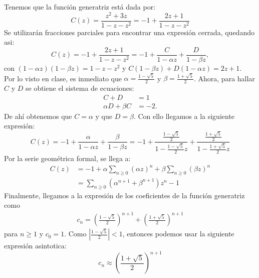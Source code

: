 \begin{solution}
    Tenemos que la función generatriz está dada por:
    \begin{equation*}
        C(z)=\frac{z^2+3z}{1-z-z^2}=-1+\frac{2z+1}{1-z-z^2}
    \end{equation*}
    Se utilizarán fracciones parciales para encontrar una expresión cerrada, quedando asi:
    \begin{equation*}
        C(z)=-1+\frac{2z+1}{1-z-z^2}=-1+\frac{C}{1-\alpha z}+\frac{D}{1-\beta z},
    \end{equation*}
    con $(1-\alpha z)(1-\beta z)=1-z-z^2$ y $C(1-\beta z)+D(1-\alpha z)=2z+1$.\\
    Por lo visto en clase, es inmediato que $\alpha=\frac{1-\sqrt{5}}{2}$ y $\beta=\frac{1+\sqrt{5}}{2}$. Ahora, para hallar $C$ y $D$ se obtiene el sistema de ecuaciones:
    \begin{align*}
        C+D&=1\\
        \alpha D+\beta C&=-2.
    \end{align*}
    De ahí obtenemos que $C=\alpha$ y que $D=\beta$. Con ello llegamos a la siguiente expresión:
    \begin{equation*}
        C(z)=-1+\frac{\alpha}{1-\alpha z}+\frac{\beta}{1-\beta z}=-1+\frac{\frac{1-\sqrt{5}}{2}}{1-\frac{1-\sqrt{5}}{2} z}+\frac{\frac{1+\sqrt{5}}{2}}{1-\frac{1+\sqrt{5}}{2} z}
    \end{equation*}
    Por la serie geométrica formal, se llega a:
    \begin{align*}
        C(z)&=-1+ \alpha\sum_{n\geq0}(\alpha z)^n+\beta\sum_{n\geq0}(\beta z)^n\\
        &=\sum_{n\geq0}(\alpha^{n+1}+\beta^{n+1})z^n-1
    \end{align*}
    Finalmente, llegamos a la expresión de los coeficientes de la función generatriz como
    \begin{align*}
        c_n=\left(\frac{1-\sqrt{5}}{2}\right)^{n+1}+\left(\frac{1+\sqrt{5}}{2}\right)^{n+1}
    \end{align*}
    para $n\geq 1$ y $c_0=1$. Como $\left|\frac{1-\sqrt{5}}{2}\right|<1$, entonces podemos usar la siguiente expresión asintotica:
    \begin{equation*}
        c_n\approx \left(\frac{1+\sqrt{5}}{2}\right)^{n+1}
    \end{equation*}
\end{solution}